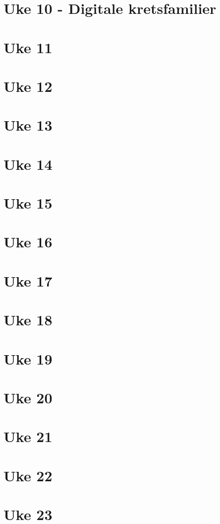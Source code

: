 \documentclass{article}
\begin{document}
  \section{Uke 10 - Digitale kretsfamilier}
    

  \section{Uke 11}
  \section{Uke 12}
  \section{Uke 13}
  \section{Uke 14}
  \section{Uke 15}
  \section{Uke 16}
  \section{Uke 17}
  \section{Uke 18}
  \section{Uke 19}
  \section{Uke 20}
  \section{Uke 21}
  \section{Uke 22}
  \section{Uke 23}
\end{document}
